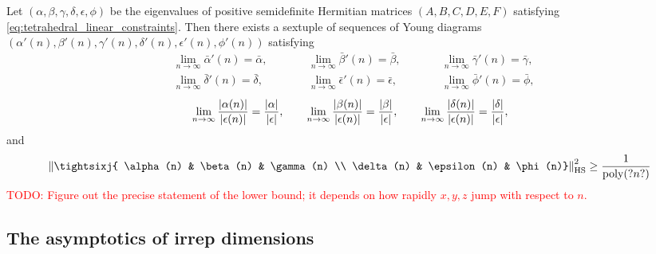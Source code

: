 \documentclass[notitlepage, 10pt]{article}
\begin{document}
\begin{thm}
    \label{thm:seq_ud_recoupling_norm_lower_bound}
    Let $(\alpha,\beta,\gamma,\delta,\epsilon,\phi)$ be the eigenvalues of positive semidefinite Hermitian matrices $(A,B,C,D,E,F)$ satisfying \cref{eq:tetrahedral_linear_constraints}.
    Then there exists a sextuple of sequences of Young diagrams $(\alpha'(n), \beta'(n), \gamma'(n), \delta'(n), \epsilon'(n), \phi'(n))$
    satisfying
    \begin{equation}
        \label{eq:sextuple_convergence}
        \begin{alignedat}{3}
            &\lim_{n\to\infty} \bar \alpha'(n) = \bar \alpha, \qquad
            &&\lim_{n\to\infty} \bar \beta'(n) = \bar \beta, \qquad
            &&\lim_{n\to\infty} \bar \gamma'(n) = \bar \gamma, \\
            &\lim_{n\to\infty} \bar \delta'(n) = \bar \delta, \qquad
            &&\lim_{n\to\infty} \bar \epsilon'(n) = \bar \epsilon, \qquad
            &&\lim_{n\to\infty} \bar \phi'(n) = \bar \phi,
        \end{alignedat}
    \end{equation}
    \begin{equation}
        \begin{alignedat}{3}
            &\lim_{n\to\infty} \frac{\left| \alpha(n)\right|}{\left| \epsilon(n)\right|} = \frac{\left|\alpha\right|}{\left|\epsilon\right|}, \qquad
            &&\lim_{n\to\infty} \frac{\left| \beta(n)\right|}{\left| \epsilon(n)\right|} = \frac{\left|\beta\right|}{\left|\epsilon\right|}, \qquad
            &&\lim_{n\to\infty} \frac{\left| \delta(n)\right|}{\left| \epsilon(n)\right|} = \frac{\left|\delta\right|}{\left|\epsilon\right|},
        \end{alignedat}
    \end{equation}
    and 
    \begin{equation}
        \label{eq:seq_ud_recoupling_norm_lower_bound}
        \norm{\tightsixj{ \alpha(n) & \beta(n) & \gamma(n) \\ \delta(n) &  \epsilon(n) &  \phi(n)}}_{\mathrm{HS}}^{2}
        \geq \frac{1}{\mathrm{poly}(?n?)} 
    \end{equation}
    \textcolor{red}{TODO: Figure out the precise statement of the lower bound; it depends on how rapidly $x,y,z$ jump with respect to $n$.}
\end{thm}


\subsection{The asymptotics of irrep dimensions}
\end{document}
